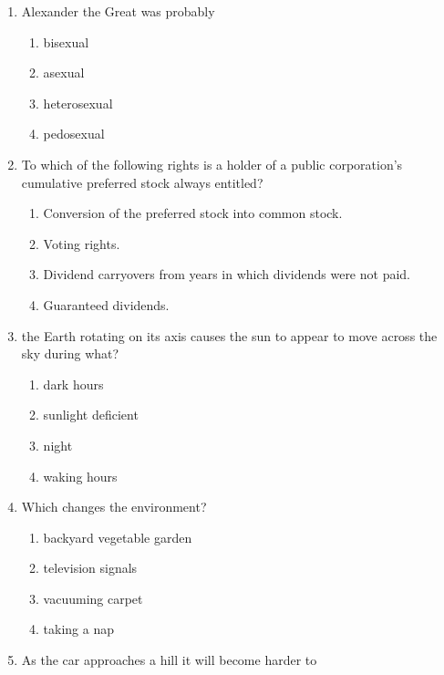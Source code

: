 \documentclass[12pt]{article}
\begin{document}
\begin{enumerate}[label=\arabic*.]
\begin{enumerate}[label=(\alph*)]
    \item Workers become skilled in all aspects of assembly.
    \item Goods can be easily modified for customers.
    \item Products can be made at a lower cost.
\end{enumerate}
\item Alexander the Great was probably
\begin{enumerate}[label=(\alph*)]
    \item bisexual
    \item asexual
    \item heterosexual
    \item pedosexual
\end{enumerate}
\item To which of the following rights is a holder of a public corporation's cumulative preferred stock always entitled?
\begin{enumerate}[label=(\alph*)]
    \item Conversion of the preferred stock into common stock.
    \item Voting rights.
    \item Dividend carryovers from years in which dividends were not paid.
    \item Guaranteed dividends.
\end{enumerate}
\item the Earth rotating on its axis causes the sun to appear to move across the sky during what?
\begin{enumerate}[label=(\alph*)]
    \item dark hours
    \item sunlight deficient
    \item night
    \item waking hours
\end{enumerate}
\item Which changes the environment?
\begin{enumerate}[label=(\alph*)]
    \item backyard vegetable garden
    \item television signals
    \item vacuuming carpet
    \item taking a nap
\end{enumerate}
\item As the car approaches a hill it will become harder to
\begin{enumerate}[label=(\alph*)]

\end{enumerate}
\end{enumerate}
\end{document}
